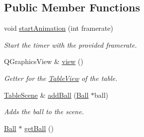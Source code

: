 \subsection*{Public Member Functions}
\begin{DoxyCompactItemize}
\item 
void \hyperlink{class_table_scene_a89034a773135a994fe062b529bfaa644}{start\+Animation} (int framerate)
\begin{DoxyCompactList}\small\item\em Start the timer with the provided framerate. \end{DoxyCompactList}\item 
\hypertarget{class_table_scene_ad7a7f185444aaabac14bff225f439ae1}{Q\+Graphics\+View \& \hyperlink{class_table_scene_ad7a7f185444aaabac14bff225f439ae1}{view} ()}\label{class_table_scene_ad7a7f185444aaabac14bff225f439ae1}

\begin{DoxyCompactList}\small\item\em Getter for the \hyperlink{class_table_view}{Table\+View} of the table. \end{DoxyCompactList}\item 
\hyperlink{class_table_scene}{Table\+Scene} \& \hyperlink{class_table_scene_ae9f0ee4cdf943de16434a8095a44c1e5}{add\+Ball} (\hyperlink{class_ball}{Ball} $\ast$ball)
\begin{DoxyCompactList}\small\item\em Adds the ball to the scene. \end{DoxyCompactList}\item 
\hypertarget{class_table_scene_ae78eb6707dc5f8e6dff5989015e08e6f}{\hyperlink{class_ball}{Ball} $\ast$ \hyperlink{class_table_scene_ae78eb6707dc5f8e6dff5989015e08e6f}{get\+Ball} ()}\label{class_table_scene_ae78eb6707dc5f8e6dff5989015e08e6f}


\end{DoxyCompactItemize}
